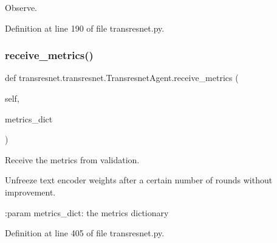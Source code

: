 \begin{DoxyVerb}Observe.\end{DoxyVerb}
 

Definition at line 190 of file transresnet.\+py.

\mbox{\label{classtransresnet_1_1transresnet_1_1TransresnetAgent_a13e2985e367518c17c74096581ecb807}} 
\subsubsection{\texorpdfstring{receive\+\_\+metrics()}{receive\_metrics()}}
{\footnotesize\ttfamily def transresnet.\+transresnet.\+Transresnet\+Agent.\+receive\+\_\+metrics (\begin{DoxyParamCaption}\item[{}]{self,  }\item[{}]{metrics\+\_\+dict }\end{DoxyParamCaption})}

\begin{DoxyVerb}Receive the metrics from validation.

Unfreeze text encoder weights after a certain number of rounds without improvement.

:param metrics_dict:
    the metrics dictionary
\end{DoxyVerb}
 

Definition at line 405 of file transresnet.\+py.



